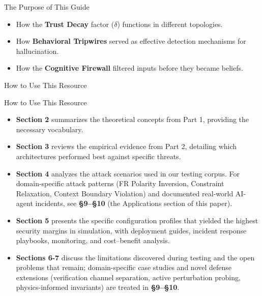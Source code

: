 \documentclass[
  ignorenonframetext,
]{beamer}
\providecommand{\tightlist}{%
  \setlength{\itemsep}{0pt}\setlength{\parskip}{0pt}}
\begin{document}
\begin{frame}[allowframebreaks]{The Purpose of This Guide}
\begin{itemize}
\tightlist
\item
  How the \textbf{Trust Decay} factor (\(\delta\)) functions in
  different topologies.
\item
  How \textbf{Behavioral Tripwires} served as effective detection
  mechanisms for hallucination.
\item
  How the \textbf{Cognitive Firewall} filtered inputs before they became
  beliefs.
\end{itemize}
\end{frame}

\begin{frame}[allowframebreaks]{How to Use This Resource}
\protect{}\label{how-to-use-this-resource}
\end{frame}

\begin{frame}[allowframebreaks]{How to Use This Resource}
\begin{itemize}
\tightlist
\item
  \textbf{Section 2} summarizes the theoretical concepts from Part 1,
  providing the necessary vocabulary.
\item
  \textbf{Section 3} reviews the empirical evidence from Part 2,
  detailing which architectures performed best against specific threats.
\item
  \textbf{Section 4} analyzes the attack scenarios used in our testing
  corpus. For domain-specific attack patterns (FR Polarity Inversion,
  Constraint Relaxation, Context Boundary Violation) and documented
  real-world AI-agent incidents, see \textbf{§9--§10} (the Applications
  section of this paper).
\item
  \textbf{Section 5} presents the specific configuration profiles that
  yielded the highest security margins in simulation, with deployment
  guides, incident response playbooks, monitoring, and cost--benefit
  analysis.
\item
  \textbf{Sections 6-7} discuss the limitations discovered during
  testing and the open problems that remain; domain-specific case
  studies and novel defense extensions (verification channel separation,
  active perturbation probing, physics-informed invariants) are treated
  in \textbf{§9--§10}.
\end{itemize}

\end{frame}
\end{document}
